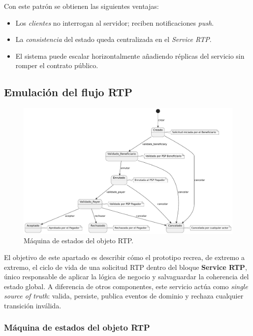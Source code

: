 Con este patrón se obtienen las siguientes ventajas:

\begin{itemize}
  \item Los \emph{clientes} no interrogan al servidor; reciben notificaciones \emph{push}.
  \item La \emph{consistencia} del estado queda centralizada en el \emph{Service RTP}.
  \item El sistema puede escalar horizontalmente añadiendo réplicas del servicio
        sin romper el contrato público.
\end{itemize}



\subsection{Emulación del flujo RTP}
\label{subsec:emulacion_flujo_rtp}

\begin{figure}[htbp]
  \centering
  \includegraphics[width=.85\textwidth]{Imagenes/DiagEstado.pdf}
  \caption{Máquina de estados del objeto RTP.}
  \label{fig:state_machine_rtp}
\end{figure}

El objetivo de este apartado es describir cómo el prototipo recrea, de extremo a extremo, el ciclo de vida de una solicitud RTP dentro del bloque \textbf{Service RTP}, único responsable de aplicar la lógica de negocio y salvaguardar la coherencia del estado global. A diferencia de otros componentes, este servicio actúa como \emph{single source of truth}: valida, persiste, publica eventos de dominio y rechaza cualquier transición inválida.

\subsubsection{Máquina de estados del objeto RTP}
\label{subsec:rtp_state_machine}

